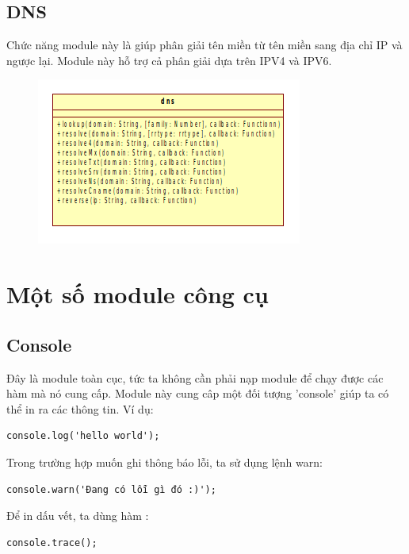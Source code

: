 \subsection{DNS}
	Chức năng module này là giúp phân giải tên miền từ tên miền sang địa chỉ IP và ngược lại. Module này hỗ trợ cả phân giải dựa trên IPV4 và IPV6.
	\begin{figure}[-h]
		\centering
		\includegraphics[scale=0.7]{3_3_8}
	\end{figure}
	

\section{Một số module công cụ}
	\subsection{Console}
	Đây là module toàn cục, tức ta không cần phải nạp module để chạy được các hàm mà nó cung cấp. Module này cung câp một đối tượng 'console' giúp ta có thể in ra các thông tin. Ví dụ:
	\begin{verbatim}
console.log('hello world');
	\end{verbatim}

	Trong trường hợp muốn ghi thông báo lỗi, ta sử dụng lệnh warn:\\
	\begin{verbatim}
console.warn('Đang có lỗi gì đó :)');
	\end{verbatim}

	Để in dấu vết, ta dùng hàm :
	\begin{verbatim}
console.trace();
	\end{verbatim}
